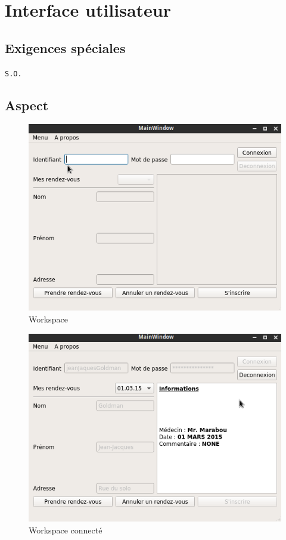 \section{Interface utilisateur}
\subsection{Exigences spéciales}
\texttt{S.O.}
\subsection{Aspect}
\begin{figure}[hb]
	\centering
	\includegraphics[scale=0.4]{MCT/GUI/workspace.png}
	\caption{Workspace}
	\label{fig:workspace}
\end{figure}
\begin{figure}[hb]
	\centering
	\includegraphics[scale=0.4]{MCT/GUI/connected.png}
	\caption{Workspace connecté}
	\label{fig:wrkconnected}
\end{figure}
